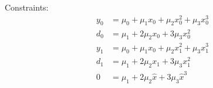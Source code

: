 

%

% 
% 
% 
% 

\label{sec:monomial-ydyd}

Constraints:
\begin{equation}
\begin{aligned}
y_0 & = \mu_0 + \mu_1 x_0 + \mu_2 x_0^{2}  + \mu_3 x_0^{3}  
\\
d_0 & = \mu_1 + 2 \mu_2 x_0 + 3 \mu_3 x_0^{2} 
\\
y_1 & = \mu_0 + \mu_1 x_0+\mu_2 x_1^{2}  + \mu_3 x_1^{3}  
\\
d_1 & = \mu_1 + 2 \mu_2 x_1 + 3 \mu_3 x_1^{2} 
\\
0 & = \mu_1 + 2 \mu_2 \hat{x}  + 3 \mu_3 \hat{x}^3  
\end{aligned}
\end{equation}

